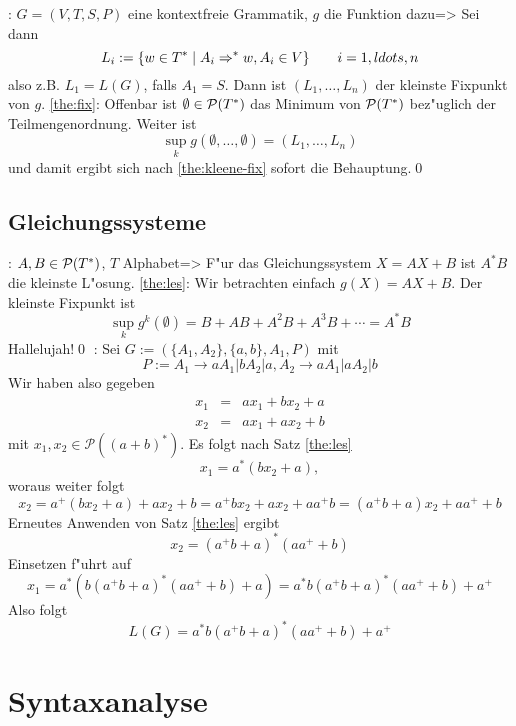 \theorem:
  $G=(V,T,S,P)$ eine kontextfreie Grammatik, $g$ die Funktion dazu=>{
  \label{the:fix}
  Sei dann
  \[L_i:=\{w\in T^*\mid A_i\derivable w,A_i\in V\}\qquad i=1,ldots,n
    \]
  also z.B. $L_1=L(G)$, falls $A_1=S$. Dann ist $(L_1,\ldots,L_n)$ der
  kleinste Fixpunkt von $g$.
  }
\proof \ref{the:fix}:{
  Offenbar ist $\emptyset\in\cal P(T^*)$ das Minimum von $\cal P(T^*)$ 
  bez"uglich der Teilmengenordnung. Weiter ist 
  \[\sup_k g(\emptyset,\ldots,\emptyset)=(L_1,\ldots,L_n)
    \]
  und damit ergibt sich nach \ref{the:kleene-fix} sofort die Behauptung.\qed
  }
\subsection{Gleichungssysteme}
\theorem:
  $A,B\in\cal P(T^*)$, $T$ Alphabet=>{
  \label{the:les}
  F"ur das Gleichungssystem $X=AX+B$ ist $A^*B$ die kleinste L"osung.
  }
\proof \ref{the:les}:{
  Wir betrachten einfach $g(X)=AX+B$. Der kleinste Fixpunkt ist
  \[\sup_k g^k(\emptyset)=B+AB+A^2B+A^3B+\cdots=A^*B
    \]
  Hallelujah!\qed
  }
\example:{
  Sei $G := (\{A_1, A_2\}, \{a, b\}, A_1, P)$ mit
  \[P := A_1 \to aA_1 | bA_2 | a, A_2 \to aA_1 | aA_2 | b
    \]
  Wir haben also gegeben
  \begin{eqnarray*}
    x_1 &=& ax_1 + bx_2 + a\\
    x_2 &=& ax_1 + ax_2 + b
  \end{eqnarray*}
  mit $x_1, x_2 \in \mathcal{P}((a+b)^*)$. Es folgt nach Satz
  \ref{the:les}
  \[x_1 = a^*(bx_2 + a),\]
  woraus weiter folgt
  \[x_2 = a^+(bx_2 + a) + ax_2 + b = a^+bx_2 + ax_2 + aa^+b = (a^+b +
  a)x_2 + aa^+ + b\]
  Erneutes Anwenden von Satz \ref{the:les} ergibt
  \[x_2 = (a^+b + a)^*(aa^+ + b)\]
  Einsetzen f"uhrt auf
  \[x_1 = a^*(b(a^+b + a)^*(aa^+ + b) + a) = a^*b(a^+b + a)^*(aa^+ + b)
  + a^+\]
  Also folgt
  \[L(G) = a^*b(a^+b + a)^*(aa^+ + b) + a^+\]
  }
\section{Syntaxanalyse}
